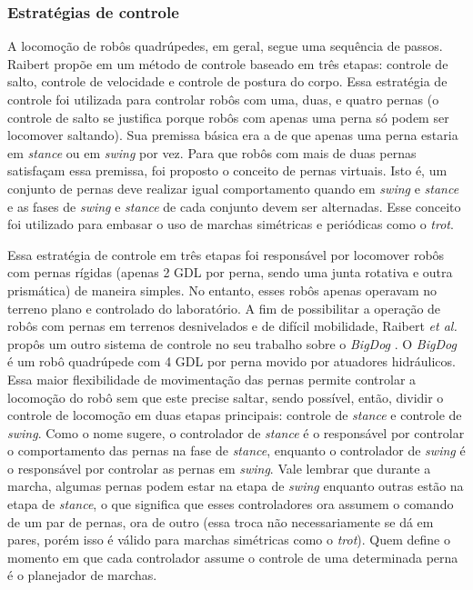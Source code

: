 \documentclass[conference]{IEEEtran}
\begin{document}
\subsubsection{Estratégias de controle}
A locomoção de robôs quadrúpedes, em geral, segue uma sequência de passos. Raibert propõe em \cite{Raibert1986} um método de controle baseado em três etapas: controle de salto, controle de velocidade e controle de postura do corpo. Essa estratégia de controle foi utilizada para controlar robôs com uma, duas, e quatro pernas (o controle de salto se justifica porque robôs com apenas uma perna só podem ser locomover saltando). Sua premissa básica era a de que apenas uma perna estaria em \textit{stance} ou em \textit{swing} por vez. Para que robôs com mais de duas pernas satisfaçam essa premissa, foi proposto o conceito de pernas virtuais. Isto é, um conjunto de pernas deve realizar igual comportamento quando em \textit{swing} e \textit{stance} e as fases de \textit{swing} e \textit{stance} de cada conjunto devem ser alternadas. Esse conceito foi utilizado para embasar o uso de marchas simétricas e periódicas como o \textit{trot}.

Essa estratégia de controle em três etapas foi responsável por locomover robôs com pernas rígidas (apenas 2 GDL por perna, sendo uma junta rotativa e outra prismática) de maneira simples. No entanto, esses robôs apenas operavam no terreno plano e controlado do laboratório. A fim de possibilitar a operação de robôs com pernas em terrenos desnivelados e de difícil mobilidade, Raibert \textit{et al.} propôs um outro sistema de controle no seu trabalho sobre o \textit{BigDog} \cite{RAIBERT200810822}. O \textit{BigDog} é um robô quadrúpede com 4 GDL por perna movido por atuadores hidráulicos. Essa maior flexibilidade de movimentação das pernas permite controlar a locomoção do robô sem que este precise saltar, sendo possível, então, dividir o controle de locomoção em duas etapas principais: controle de \textit{stance} e controle de \textit{swing}. Como o nome sugere, o controlador de \textit{stance} é o responsável por controlar o comportamento das pernas na fase de \textit{stance}, enquanto o controlador de \textit{swing} é o responsável por controlar as pernas em \textit{swing}. Vale lembrar que durante a marcha, algumas pernas podem estar na etapa de \textit{swing} enquanto outras estão na etapa de \textit{stance}, o que significa que esses controladores ora assumem o comando de um par de pernas, ora de outro (essa troca não necessariamente se dá em pares, porém isso é válido para marchas simétricas como o \textit{trot}). Quem define o momento em que cada controlador assume o controle de uma determinada perna é o planejador de marchas.
\end{document}
